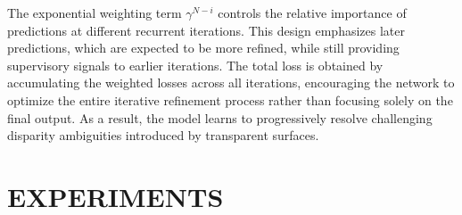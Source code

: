 \documentclass[letterpaper, 10 pt, conference]{ieeeconf}  %
\begin{document}
The exponential weighting term $\gamma^{N-i}$ controls the relative importance of predictions at different recurrent iterations. This design emphasizes later predictions, which are expected to be more refined, while still providing supervisory signals to earlier iterations. The total loss is obtained by accumulating the weighted losses across all iterations, encouraging the network to optimize the entire iterative refinement process rather than focusing solely on the final output. As a result, the model learns to progressively resolve challenging disparity ambiguities introduced by transparent surfaces.

\section{EXPERIMENTS}
\end{document}
